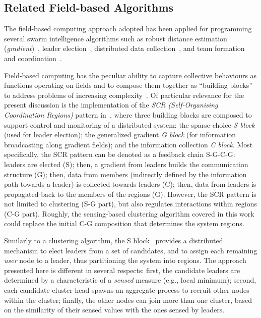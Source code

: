 \subsection{Related Field-based Algorithms} %
\label{s:rw:related-ac-algorithms}
The field-based computing approach adopted has been applied for
 programming several swarm intelligence algorithms
 such as robust distance estimation (\emph{gradient})~\cite{DBLP:conf/saso/AudritoCDV17},
 leader election~\cite{DBLP:conf/saso/MoBD18},
 distributed data collection~\cite{audrito2021jcee-distributed-collection},
 and team formation and coordination~\cite{DBLP:journals/eaai/CasadeiVAPD21}.

Field-based computing has the peculiar ability to capture collective behaviours as functions operating on fields
and to compose them together as ``building blocks'' to address problems of increasing complexity~\cite{DBLP:journals/jlap/ViroliBDACP19}.
%
Of particular relevance for the present discussion is the implementation of the \emph{SCR (Self-Organising Coordination Regions)} pattern in~\cite{DBLP:journals/fgcs/PianiniCVN21}, where three building blocks are composed to support control and monitoring of a distributed system: the sparse-choice \emph{S block} (used for leader election); the generalized gradient \emph{G block} (for information broadcasting along gradient fields); and the information collection \emph{C block}.
%
Most specifically, the SCR pattern can be denoted as a feedback chain S-G-C-G: leaders are elected (S); then, a gradient from leaders builds the communication structure (G); then, data from members (indirectly defined by the information path towards a leader) is collected towards leaders (C); then, data from leaders is propagated back to the members of the regions (G).
%
However, the SCR pattern is not limited to clustering (S-G part), but also regulates interactions within regions (C-G part).
%
Roughly, the sensing-based clustering algorithm
 covered in this work could replace the initial C-G composition
 that determines the system regions.

Similarly to a clustering algorithm, 
 the S block~\cite{DBLP:conf/saso/MoBD18} provides a distributed mechanism to elect leaders from a set of candidates, 
 and to assign each remaining {\em user} node to a leader, 
 thus partitioning the system into regions. 
% 
The approach presented here is different in several respects: 
%
 first, the candidate leaders are determined by a characteristic of a \emph{sensed} measure (e.g., local minimum); 
%
 second, each candidate cluster head spawns an aggregate process to recruit other nodes within the cluster; 
% 
 finally, the other nodes can join more than one cluster, based on the similarity of their sensed values with the ones sensed by leaders.

